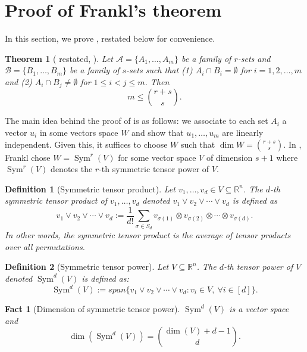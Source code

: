 \documentclass{article}
\newtheorem{theorem}{Theorem}[section]
\newtheorem{fact}[fact]{Fact}
\newtheorem{definition}[definition]{Definition}
\DeclareMathOperator{\Sym}{Sym}
\newcommand{\rr}{\mathbb{R}}
\newcommand{\<}{\langle}
\renewcommand{\>}{\rangle}
\newcommand{\calA}{\mathcal{A}}
\newcommand{\calB}{\mathcal{B}}
\begin{document}
\section{Proof of Frankl's theorem}\label{sec:appendix}
In this section, we prove , restated below for convenience.

\begin{theorem}[ restated, \cite{Frankl1982ExtremalProblem}]\label{thn:frankl_restated}
    Let $\calA = \{A_1,\ldots,A_m\}$ be a family of $r$-sets and $\calB = \{B_1,\ldots,B_m\}$ be a family of $s$-sets such that (1) $A_i \cap B_i = \emptyset$ for $i = 1,2,\ldots,m$ and (2)  $A_i \cap B_j \neq \emptyset$ for $1 \leq i < j \leq m$. Then 
    \[
    m \leq \binom{r+s}{s}.
    \]
\end{theorem}

The main idea behind the proof of  is as follows: we associate to each set $A_i$ a vector $u_i$ in some vectors space $W$ and show that $u_1,\ldots,u_m$ are linearly independent. Given this, it suffices to choose $W$ such that $\dim W = \binom{r+s}{s}$. In \cite{Frankl1982ExtremalProblem}, Frankl chose $W = \Sym^r (V)$ for some vector space $V$ of dimension $s+1$ where $\Sym^r (V)$ denotes the $r$-th symmetric tensor power of $V$.
 
\begin{definition}[Symmetric tensor product] Let $v_1,\ldots,v_d \in V \subseteq \rr^n$. The $d$-th symmetric tensor product of $v_1,\ldots,v_d$ denoted $v_1 \vee v_2 \vee \cdots \vee v_d$ is defined as
\[
v_1 \vee v_2 \vee \cdots \vee v_d := \frac{1}{d!}\sum_{\sigma \in S_d}v_{\sigma (1)} \otimes v_{\sigma (2)} \otimes \cdots \otimes v_{\sigma (d)}.
\]
In other words, the symmetric tensor product is the average of tensor products over all permutations.    
\end{definition}

\begin{definition}[Symmetric tensor power]
    Let $V \subseteq \rr^n$. The $d$-th tensor power of $V$ denoted $\Sym^d (V)$ is defined as:
    \[
    \Sym^d (V):= span\{v_1 \vee v_2 \vee \cdots \vee v_d: v_i \in V, \ \forall i \in [d]\}.
    \]
\end{definition}

\begin{fact}[Dimension of symmetric tensor power]\label{fact:dim_sym_tensor_power}
    $\Sym^d (V)$ is a vector space and
    \[
    \dim (\Sym^d (V)) = \binom{\dim (V) + d - 1}{d}.
    \]
\end{fact}
\end{document}
